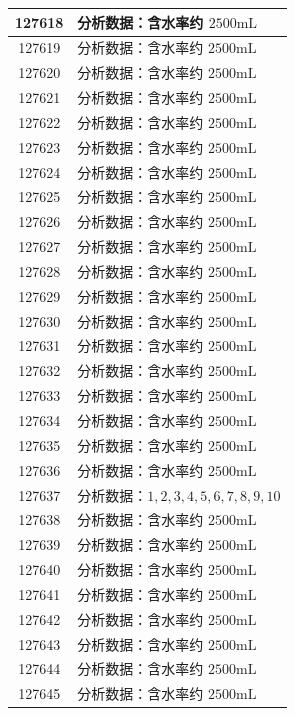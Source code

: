 \documentclass[UTF8,10pt,a4paper,fontset=fandol]{ctexart}
\begin{document}
\begin{center}
\begin{minipage}[t]{0.47\textwidth}
\begin{tabularx}{\linewidth}{|c|X|}
127618 & 分析数据：含水率约 $2500\mathrm{mL}$ \\ \hline
127619 & 分析数据：含水率约 $2500\mathrm{mL}$ \\ \hline
127620 & 分析数据：含水率约 $2500\mathrm{mL}$ \\ \hline
127621 & 分析数据：含水率约 $2500\mathrm{mL}$ \\ \hline
127622 & 分析数据：含水率约 $2500\mathrm{mL}$ \\ \hline
127623 & 分析数据：含水率约 $2500\mathrm{mL}$ \\ \hline
127624 & 分析数据：含水率约 $2500\mathrm{mL}$ \\ \hline
127625 & 分析数据：含水率约 $2500\mathrm{mL}$ \\ \hline
127626 & 分析数据：含水率约 $2500\mathrm{mL}$ \\ \hline
127627 & 分析数据：含水率约 $2500\mathrm{mL}$ \\ \hline
127628 & 分析数据：含水率约 $2500\mathrm{mL}$ \\ \hline
127629 & 分析数据：含水率约 $2500\mathrm{mL}$ \\ \hline
127630 & 分析数据：含水率约 $2500\mathrm{mL}$ \\ \hline
127631 & 分析数据：含水率约 $2500\mathrm{mL}$ \\ \hline
127632 & 分析数据：含水率约 $2500\mathrm{mL}$ \\ \hline
127633 & 分析数据：含水率约 $2500\mathrm{mL}$ \\ \hline
127634 & 分析数据：含水率约 $2500\mathrm{mL}$ \\ \hline
127635 & 分析数据：含水率约 $2500\mathrm{mL}$ \\ \hline
127636 & 分析数据：含水率约 $2500\mathrm{mL}$ \\ \hline
127637 & 分析数据：$1,2,3,4,5,6,7,8,9,10$ \\ \hline
127638 & 分析数据：含水率约 $2500\mathrm{mL}$ \\ \hline
127639 & 分析数据：含水率约 $2500\mathrm{mL}$ \\ \hline
127640 & 分析数据：含水率约 $2500\mathrm{mL}$ \\ \hline
127641 & 分析数据：含水率约 $2500\mathrm{mL}$ \\ \hline
127642 & 分析数据：含水率约 $2500\mathrm{mL}$ \\ \hline
127643 & 分析数据：含水率约 $2500\mathrm{mL}$ \\ \hline
127644 & 分析数据：含水率约 $2500\mathrm{mL}$ \\ \hline
127645 & 分析数据：含水率约 $2500\mathrm{mL}$ \\ \hline
\end{tabularx}


\end{minipage}
\end{center}
\end{document}
